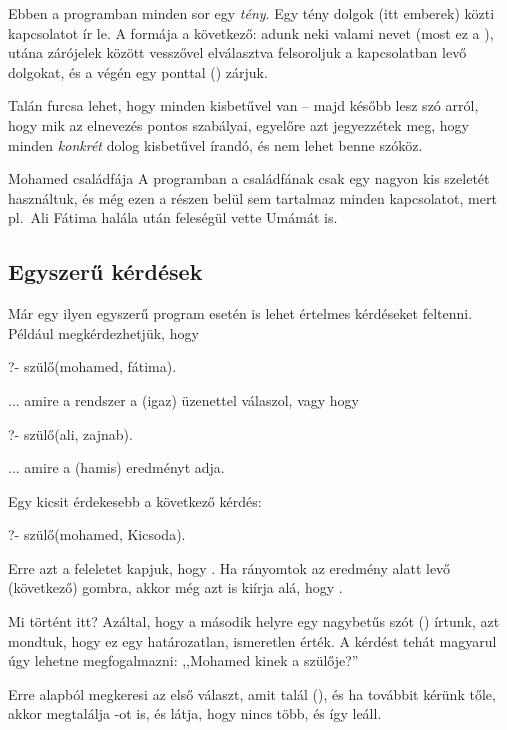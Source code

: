 Ebben a programban minden sor egy \emph{tény}. Egy
tény dolgok (itt emberek) közti kapcsolatot ír
le. A formája a következő: adunk neki valami nevet
(most ez a ), utána zárójelek között
vesszővel elválasztva felsoroljuk a kapcsolatban
levő dolgokat, és a végén egy ponttal ()
zárjuk.

Talán furcsa lehet, hogy minden kisbetűvel van --
majd később lesz szó arról, hogy mik az elnevezés
pontos szabályai, egyelőre azt jegyezzétek meg,
hogy minden \emph{konkrét} dolog kisbetűvel
írandó, és nem lehet benne szóköz.

\begin{infobox}{.75}{Mohamed családfája}
A programban a családfának csak egy nagyon kis
szeletét használtuk, és még ezen a részen belül
sem tartalmaz minden kapcsolatot, mert pl.~Ali
Fátima halála után feleségül vette Umámát is.
\end{infobox}

\subsection*{Egyszerű kérdések}

Már egy ilyen egyszerű program esetén is lehet
értelmes kérdéseket feltenni. Például
megkérdezhetjük, hogy
\begin{prolog}
?- szülő(mohamed, fátima).
\end{prolog}
... amire a rendszer a  (igaz) üzenettel
válaszol, vagy hogy
\begin{prolog}
?- szülő(ali, zajnab).
\end{prolog}
... amire a  (hamis) eredményt adja.

Egy kicsit érdekesebb a következő kérdés:
\begin{prolog}
?- szülő(mohamed, Kicsoda).
\end{prolog}
Erre azt a feleletet kapjuk, hogy . Ha rányomtok az eredmény alatt levő  (következő) gombra, akkor még azt is kiírja alá, hogy .

Mi történt itt? Azáltal, hogy a második helyre egy nagybetűs szót () írtunk, azt mondtuk, hogy ez egy határozatlan, ismeretlen érték. A kérdést tehát magyarul úgy lehetne megfogalmazni: ,,Mohamed kinek a szülője?''

Erre alapból megkeresi az első választ, amit talál (), és ha továbbit kérünk tőle, akkor megtalálja -ot is, és látja, hogy nincs több, és így leáll.

